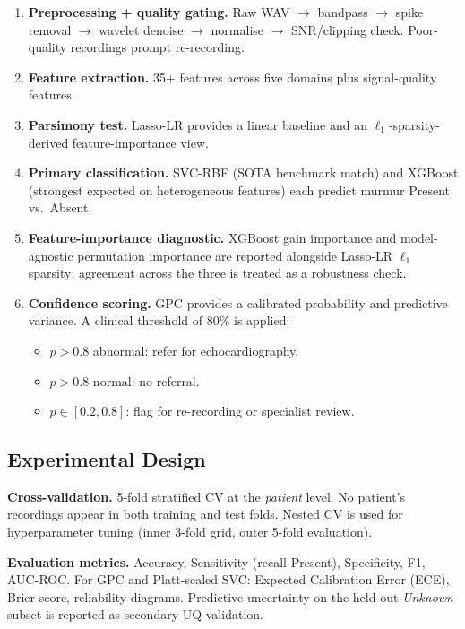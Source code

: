 \documentclass[10pt,twocolumn]{article}
\begin{document}
\begin{enumerate}
    \item \textbf{Preprocessing + quality gating.} Raw WAV $\rightarrow$ bandpass $\rightarrow$ spike removal $\rightarrow$ wavelet denoise $\rightarrow$ normalise $\rightarrow$ SNR/clipping check. Poor-quality recordings prompt re-recording.
    \item \textbf{Feature extraction.} 35+ features across five domains plus signal-quality features.
    \item \textbf{Parsimony test.} Lasso-LR provides a linear baseline and an $\ell_1$-sparsity-derived feature-importance view.
    \item \textbf{Primary classification.} SVC-RBF (SOTA benchmark match) and XGBoost (strongest expected on heterogeneous features) each predict murmur Present vs.\ Absent.
    \item \textbf{Feature-importance diagnostic.} XGBoost gain importance and model-agnostic permutation importance are reported alongside Lasso-LR $\ell_1$ sparsity; agreement across the three is treated as a robustness check.
    \item \textbf{Confidence scoring.} GPC provides a calibrated probability and predictive variance. A clinical threshold of 80\% is applied:
    \begin{itemize}
        \item $p > 0.8$ abnormal: refer for echocardiography.
        \item $p > 0.8$ normal: no referral.
        \item $p \in [0.2, 0.8]$: flag for re-recording or specialist review.
    \end{itemize}
\end{enumerate}

\subsection{Experimental Design}

\textbf{Cross-validation.} 5-fold stratified CV at the \textit{patient} level. No patient's recordings appear in both training and test folds. Nested CV is used for hyperparameter tuning (inner 3-fold grid, outer 5-fold evaluation).

\textbf{Evaluation metrics.} Accuracy, Sensitivity (recall-Present), Specificity, F1, AUC-ROC. For GPC and Platt-scaled SVC: Expected Calibration Error (ECE), Brier score, reliability diagrams. Predictive uncertainty on the held-out \textit{Unknown} subset is reported as secondary UQ validation.
\end{document}
